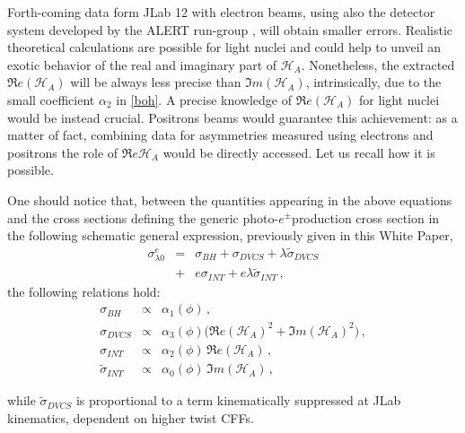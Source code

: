 \documentclass[times, twoside]{PosWhiPap}
\begin{document}
Forth-coming data form JLab 12 with electron beams, using also the detector system
developed by the ALERT run-group \cite{Armstrong:2017wfw}, will obtain smaller 
errors. Realistic theoretical calculations are possible for light nuclei and could help 
to unveil an exotic behavior of the real and imaginary part of $\mathcal{H}_{A}$.
Nonetheless, the extracted $\Re e(\mathcal{H}_{A})$ will be always less precise than
$\Im m(\mathcal{H}_{A})$, intrinsically, due to the small coefficient $\alpha_2$
in \eqref{boh}.
A precise knowledge of $\Re e(\mathcal{H}_{A})$ for light nuclei would be instead crucial.
Positrons beams would guarantee this achievement: as a matter of fact, combining data for asymmetries measured 
using electrons and positrons the role of $\Re e \mathcal{H}_{A}$ would be 
directly accessed. Let us recall how it is possible.

One should notice that, between the quantities appearing in the above
equations and the cross sections defining the generic photo-$e^\pm$production 
cross section in the following schematic general expression, previously given 
in this White Paper,
\begin{eqnarray}
\sigma^e_{\lambda 0}  & = & \sigma_{BH} + \sigma_{DVCS} + \lambda \tilde \sigma_{DVCS} 
\nonumber
\\
& + & e\sigma_{INT} + e \lambda \tilde \sigma_{INT} \, ,
\label{gen}
\end{eqnarray}
the following relations hold:
\begin{eqnarray}
\sigma_{BH} & \propto & \alpha_1(\phi)\, ,
\nonumber \\
\sigma_{DVCS} & \propto &   \alpha_{3}(\phi) 
\big( \Re e(\mathcal{H}_{A})^{2} + \Im m(\mathcal{H}_{A})^{2} \big) \, ,
\nonumber \\
\sigma_{INT} & \propto & \alpha_{2}(\phi) \, \Re e(\mathcal{H}_{A}) \, ,
\nonumber \\
\tilde \sigma_{INT} & \propto & \alpha_{0}(\phi) \, \Im m(\mathcal{H}_{A}) \, ,
\end{eqnarray}

while $\tilde \sigma_{DVCS} $ is proportional to a term kinematically suppressed
at JLab kinematics, dependent on higher twist CFFs. 
\end{document}
